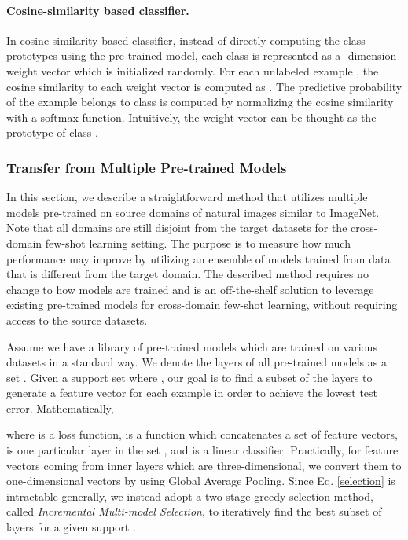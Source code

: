 \documentclass[runningheads]{llncs}
\begin{document}
\paragraph{Cosine-similarity based classifier.} 
In cosine-similarity based classifier, instead of directly computing the class prototypes using the pre-trained model, each class  is represented as a -dimension weight vector  which is initialized randomly. For each unlabeled example , the cosine similarity to each weight vector is computed as . The predictive probability of the example  belongs to class  is computed by normalizing the cosine similarity with a softmax function. Intuitively, the weight vector  can be thought as the prototype of class .


\subsubsection{Transfer from Multiple Pre-trained Models}
In this section, we describe a straightforward method that utilizes multiple models pre-trained on source domains of natural images similar to ImageNet. Note that all domains are still disjoint from the target datasets for the cross-domain few-shot learning setting. The purpose is to measure how much performance may improve by utilizing an ensemble of models trained from data that is different from the target domain. The described method requires no change to how models are trained and is an off-the-shelf solution to leverage existing pre-trained models for cross-domain few-shot learning, without requiring access to the source datasets.




Assume we have a library of  pre-trained models  which are trained on various datasets in a standard way. We denote the layers of all pre-trained models as a set . Given a support set  where , our goal is to find a subset  of the layers to generate a feature vector for each example in order to achieve the lowest test error. Mathematically, 
 


\noindent where  is a loss function,  is a function which concatenates a set of feature vectors,  is one particular layer in the set , and  is a linear classifier. Practically, for feature vectors  coming from inner layers which are three-dimensional, we convert them to one-dimensional vectors by using Global Average Pooling. Since Eq. \ref{selection} is intractable generally, we instead adopt a two-stage greedy selection method, called \textit{Incremental Multi-model Selection}, to iteratively find the best subset of layers for a given support . 
\end{document}
